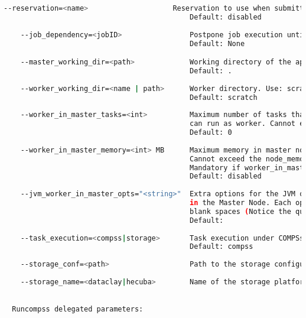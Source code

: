\begin{lstlisting}[language=bash]
    --reservation=<name>                    Reservation to use when submitting the job. 
                                            Default: disabled
                                            
    --job_dependency=<jobID>                Postpone job execution until the job dependency has ended.
                                            Default: None

    --master_working_dir=<path>             Working directory of the application
                                            Default: .
                                            
    --worker_working_dir=<name | path>      Worker directory. Use: scratch | gpfs | <path>
                                            Default: scratch
                                            
    --worker_in_master_tasks=<int>          Maximum number of tasks that the master node 
                                            can run as worker. Cannot exceed tasks_per_node.
                                            Default: 0
                                            
    --worker_in_master_memory=<int> MB      Maximum memory in master node assigned to the worker.
                                            Cannot exceed the node_memory.
                                            Mandatory if worker_in_master_tasks is specified.
                                            Default: disabled
                                            
    --jvm_worker_in_master_opts="<string>"  Extra options for the JVM of the COMPSs Worker 
                                            in the Master Node. Each option separed by "," and without 
                                            blank spaces (Notice the quotes)
                                            Default: 
                                            
    --task_execution=<compss|storage>       Task execution under COMPSs or Storage.
                                            Default: compss
                                            
    --storage_conf=<path>                   Path to the storage configuration file
    
    --storage_name=<dataclay|hecuba>        Name of the storage platform dataClay or Hecuba.
    

  Runcompss delegated parameters:


\end{lstlisting}
